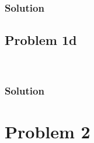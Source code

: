 \documentclass[conf]{new-aiaa}
\begin{document}

\subsubsection*{Solution} 





\subsection*{Problem 1d} 

\begin{center}
	 \\
\end{center}


\subsubsection*{Solution} 





\section*{Problem 2} 
\end{document}
